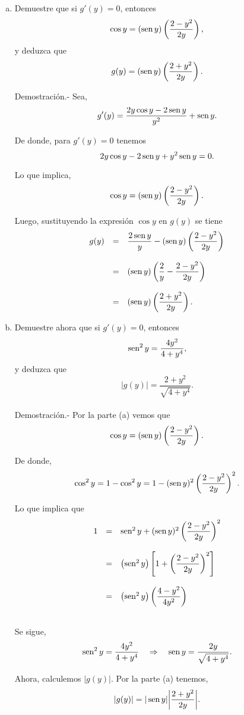 \begin{enumerate}[\bfseries 1.]
\begin{enumerate}[(a)]
	    \item Demuestre que si $g'(y)=0$, entonces
	    $$\cos y = (\mathop{\mbox{\normalfont sen}}\nolimits y)\left(\dfrac{2-y^2}{2y}\right),$$
	    y deduzca que
	    $$g(y)=(\mathop{\mbox{\normalfont sen}}\nolimits y)\left(\dfrac{2+y^2}{2y}\right).$$

		Demostración.-\; Sea,
		$$g'(y)=\dfrac{2y\cos y -2\mathop{\mbox{\normalfont sen}}\nolimits y}{y^2}+\mathop{\mbox{\normalfont sen}}\nolimits y.$$

		De donde, para $g'(y)=0$ tenemos
		$$2y\cos y-2\mathop{\mbox{\normalfont sen}}\nolimits y+y^2\mathop{\mbox{\normalfont sen}}\nolimits y = 0.$$

		Lo que implica,
		$$\cos y = (\mathop{\mbox{\normalfont sen}}\nolimits y)\left(\dfrac{2-y^2}{2y}\right).$$

		Luego, sustituyendo la expresión $\cos y$ en $g(y)$ se tiene
		$$
		\begin{array}{rcl}
		    g(y) &=& \dfrac{2\mathop{\mbox{\normalfont sen}}\nolimits y}{y} - (\mathop{\mbox{\normalfont sen}}\nolimits y)\left(\dfrac{2-y^2}{2y}\right)\\\\
			 &=& (\mathop{\mbox{\normalfont sen}}\nolimits y)\left(\dfrac{2}{y}-\dfrac{2-y^2}{2y}\right)\\\\
			 &=& (\mathop{\mbox{\normalfont sen}}\nolimits y)\left(\dfrac{2+y^2}{2y}\right).
		\end{array}
		$$
		\vspace{0.5cm}

	    \item Demuestre ahora que si $g'(y)=0$, entonces
	    $$\mathop{\mbox{\normalfont sen}}\nolimits^2y=\dfrac{4y^2}{4+y^4},$$
	    y deduzca que
	    $$|g(y)|=\dfrac{2+y^2}{\sqrt{4+y^4}}.$$\\
		Demostración.-\; Por la parte (a) vemos que
		$$\cos y = (\mathop{\mbox{\normalfont sen}}\nolimits y)\left(\dfrac{2-y^2}{2y}\right).$$

		De donde,
		$$\cos^2 y = 1-\cos^2y = 1-(\mathop{\mbox{\normalfont sen}}\nolimits y)^2\left(\dfrac{2-y^2}{2y}\right)^2.$$

		Lo que implica que
		$$
		\begin{array}{rcl}
		    1 &=& \mathop{\mbox{\normalfont sen}}\nolimits^2 y + (\mathop{\mbox{\normalfont sen}}\nolimits y)^2 \left(\dfrac{2-y^2}{2y}\right)^2\\\\
		      &=& \left(\mathop{\mbox{\normalfont sen}}\nolimits^2 y\right)\left[1+\left(\dfrac{2-y^2}{2y}\right)^2\right]\\\\
		      &=& \left(\mathop{\mbox{\normalfont sen}}\nolimits^2 y\right)\left(\dfrac{4-y^2}{4y^2}\right)\\\\
		\end{array}
		$$

		Se sigue,
		$$\mathop{\mbox{\normalfont sen}}\nolimits^2 y = \dfrac{4y^2}{4+y^4}\quad \Rightarrow \quad \mathop{\mbox{\normalfont sen}}\nolimits y = \dfrac{2y}{\sqrt{4+y^4}}.$$

		Ahora, calculemos $|g(y)|$. Por la parte (a) tenemos,
		$$|g(y)|=|\mathop{\mbox{\normalfont sen}}\nolimits y|\bigg|\dfrac{2+y^2}{2y}\bigg|.$$


\end{enumerate}
\end{enumerate}
